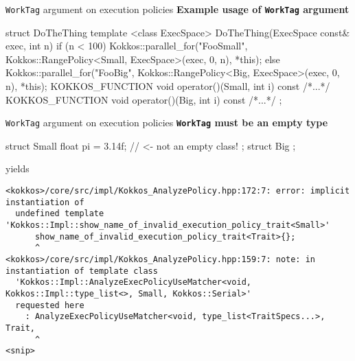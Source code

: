 
\begin{frame}[fragile]{\texttt{WorkTag} argument on execution policies}
\textbf{Example usage of \texttt{WorkTag} argument}
\begin{code}[keywords={Small,Big}]
struct DoTheThing {
  template <class ExecSpace>
  DoTheThing(ExecSpace const& exec, int n) {
    if (n < 100) {
      Kokkos::parallel_for("FooSmall",
          Kokkos::RangePolicy<Small, ExecSpace>(exec, 0, n),
          *this);
    } else {
      Kokkos::parallel_for("FooBig",
          Kokkos::RangePolicy<Big, ExecSpace>(exec, 0, n),
          *this);
    }
  }
  KOKKOS_FUNCTION void operator()(Small, int i) const { /*...*/ }
  KOKKOS_FUNCTION void operator()(Big, int i) const { /*...*/ }
};
\end{code}
\end{frame}


\begin{frame}[fragile]{\texttt{WorkTag} argument on execution policies}
\textbf{\texttt{WorkTag} must be an empty type}
\begin{code}[keywords={Small,Big}]
struct Small {
  float pi = 3.14f;  // <- not an empty class!
};
struct Big {};
\end{code}

yields
{\tiny
\begin{verbatim}
<kokkos>/core/src/impl/Kokkos_AnalyzePolicy.hpp:172:7: error: implicit instantiation of
  undefined template 'Kokkos::Impl::show_name_of_invalid_execution_policy_trait<Small>'
      show_name_of_invalid_execution_policy_trait<Trait>{};
      ^
<kokkos>/core/src/impl/Kokkos_AnalyzePolicy.hpp:159:7: note: in instantiation of template class
  'Kokkos::Impl::AnalyzeExecPolicyUseMatcher<void, Kokkos::Impl::type_list<>, Small, Kokkos::Serial>'
  requested here
    : AnalyzeExecPolicyUseMatcher<void, type_list<TraitSpecs...>, Trait,
      ^
<snip>
\end{verbatim}
}
\end{frame}


